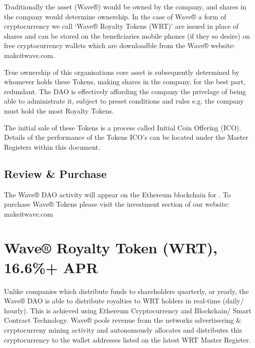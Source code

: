 \documentclass[letterpaper,10pt,openany,oneside,english]{sphinxmanual}
\begin{document}
Traditionally the asset (Wave®) would be owned by the company, and shares in the company would determine ownership.
In the case of Wave® a form of cryptocurrency we call ‘Wave® Royalty Tokens (WRT)’ are issued in place of shares and can be stored on the beneficiaries mobile phones (if they so desire) on free cryptocurrency wallets which are downloadble from the Wave®  website: makeitwave.com.

True ownership of this organisations core asset is subsequently determined by whomever holds these Tokens, making shares in the company, for the best part, redundant.
The DAO is effectively affording the company the privelage of being able to administrate it, subject to preset conditions and rules e.g. the company must hold the most Royalty Tokens.

The initial sale of these Tokens is a process called Initial Coin Offering (ICO).
Details of the performance of the Tokens ICO’s can be located under the Master Registers within this document.


\section{Review \& Purchase}
\label{\detokenize{introduction:review-purchase}}
The Wave® DAO activity will appear on the Ethereum blockchain for .
To purchase Wave® Tokens please visit the investment section of our website: makeitwave.com


\chapter{Wave® Royalty Token (WRT), 16.6\%+ APR}
\label{\detokenize{wrt-summary:wave-royalty-token-wrt-16-6-apr}}\label{\detokenize{wrt-summary::doc}}
Unlike companies which distribute funds to shareholders quarterly, or yearly, the Wave® DAO is able to distribute royalties to WRT holders in real-time (daily/ hourly).
This is achieved using Ethereum Cryptocurrency and Blockchain/ Smart Contract Technology. Wave® pools revenue from the networks advertisering \& cryptocurreny mining activity and autonomously allocates and distributes this cryptocurrency to the wallet addresses listed on the latest WRT Master Register.
\end{document}
